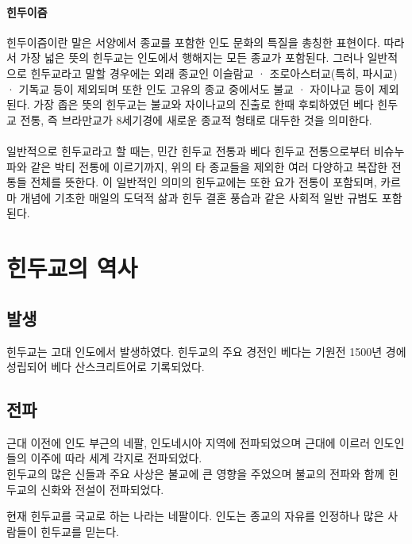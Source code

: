 \documentclass[12pt, a4paper, oneside]{book}
\let\stdsection\section
\renewcommand\section{\newpage\stdsection}
\begin{document}
\paragraph{힌두이즘}
힌두이즘이란 말은 서양에서 종교를 포함한 인도 문화의 특질을 총칭한 표현이다.
따라서 가장 넓은 뜻의 힌두교는 인도에서 행해지는 모든 종교가 포함된다.
그러나 일반적으로 힌두교라고 말할 경우에는 외래 종교인 이슬람교 · 조로아스터교(특히, 파시교) · 기독교 등이 제외되며 또한 인도 고유의 종교 중에서도 불교 · 자이나교 등이 제외된다.
가장 좁은 뜻의 힌두교는 불교와 자이나교의 진출로 한때 후퇴하였던 베다 힌두교 전통, 즉 브라만교가 8세기경에 새로운 종교적 형태로 대두한 것을 의미한다.

\paragraph{}
일반적으로 힌두교라고 할 때는, 민간 힌두교 전통과 베다 힌두교 전통으로부터 비슈누파와 같은 박티 전통에 이르기까지, 위의 타 종교들을 제외한 여러 다양하고 복잡한 전통들 전체를 뜻한다. 
이 일반적인 의미의 힌두교에는 또한 요가 전통이 포함되며, 카르마 개념에 기초한 매일의 도덕적 삶과 힌두 결혼 풍습과 같은 사회적 일반 규범도 포함된다.




%
	\section{힌두교의 역사}


\subsection{발생}
힌두교는 고대 인도에서 발생하였다. 힌두교의 주요 경전인 베다는 기원전 1500년 경에 성립되어 베다 산스크리트어로 기록되었다.

\subsection{전파}
근대 이전에 인도 부근의 네팔, 인도네시아 지역에 전파되었으며 근대에 이르러 인도인들의 이주에 따라 세계 각지로 전파되었다. \\
힌두교의 많은 신들과 주요 사상은 불교에 큰 영향을 주었으며 불교의 전파와 함께 힌두교의 신화와 전설이 전파되었다.

현재 힌두교를 국교로 하는 나라는 네팔이다. 
인도는 종교의 자유를 인정하나 많은 사람들이 힌두교를 믿는다.
\end{document}
